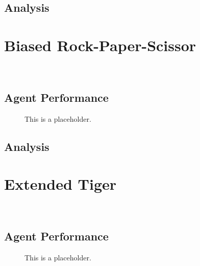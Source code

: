 \subsection{Analysis}




\section{Biased Rock-Paper-Scissor}\
\label{sec:biased_rock_paper_scissor}
\subsection{Agent Performance} 

\begin{figure}[!hbtp]
  \label{fig:cost}
  \makebox[\textwidth]{\framebox[5cm]{\rule{0pt}{5cm}}}
\caption{This is a placeholder.{\label{biased_rock_paper_scissor_performance}}}
  



\end{figure}


\subsection{Analysis}

\section{Extended Tiger}\
\label{sec:extended_tiger}
\subsection{Agent Performance} 

\begin{figure}[!hbtp]
  \label{fig:cost}
  \makebox[\textwidth]{\framebox[5cm]{\rule{0pt}{5cm}}}
\caption{This is a placeholder.{\label{cheese_maze_performance}}}
  



\end{figure}



